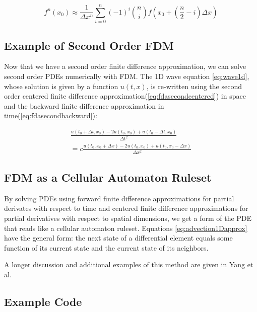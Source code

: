 {  \begin{equation}\label{eq:generalFDACenter}
 f^{n}(x_{0}) \approx \frac{1}{\Delta  x^{n}}\sum_{i=0}^{n}(-1)^{i}\binom {n} {i}f(x_{0} + \left(\frac{n}{2}-i\right)\Delta  x)
 \end{equation}
 
\subsection{Example of Second Order FDM}

Now that we have a second order finite difference approximation, we can solve second order PDEs numerically with FDM.  The 1D wave equation \ref{eq:wave1d}, whose solution is given by a function $u(t, x)$, is re-written using the second order centered finite difference approximation(\ref{eq:fdasecondcentered}) in space and the backward finite difference approximation in time(\ref{eq:fdasecondbackward}):

 \begin{equation}
 \begin{split}
  \frac{u(t_{0} + \Delta  t, x_{0}) - 2u(t_{0}, x_{0}) +u(t_{0} - \Delta  t, x_{0})}{\Delta  t^{2}}\\
 = c  \frac{u(t_0, x_{0} + \Delta  x) - 2u(t_0, x_{0}) +u(t_0, x_{0} - \Delta  x) }{\Delta  x^{2}}
 \end{split}
  \end{equation}

\subsection{FDM as a Cellular Automaton Ruleset}

By solving PDEs using forward finite difference approximations for partial derivates with respect to time and centered finite difference approximations for partial derivatives with respect to spatial dimensions, we get a form of the PDE that reads like a cellular automaton ruleset.  Equations \ref{eq:advection1Dapprox} have the general form: the next state of a differential element equals some function of its current state and the current state of its neighbors.

A longer discussion and additional examples of this method are given in Yang et al\cite{Yang2010}.

\subsection{Example Code}

}
